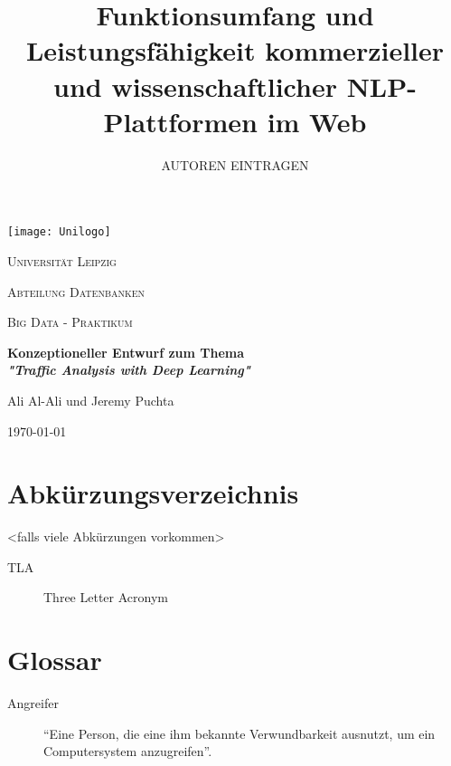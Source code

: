 \documentclass[12pt,a4paper, halfparskip]{scrartcl}
\title{Funktionsumfang und Leistungsfähigkeit kommerzieller und wissenschaftlicher NLP-Plattformen im Web}
\author{AUTOREN EINTRAGEN}
\begin{document}
\begin{titlepage}
	\centering
	\texttt{[image: Unilogo]}\par\vspace{1cm}
	{\scshape\LARGE Universität Leipzig \par}
	\vspace{0.5cm}
	{\scshape\Large Abteilung Datenbanken \par}
	\vspace{0.2cm}
	{\scshape\large Big Data - Praktikum \par}
	\vspace{1cm}
	{\huge\bfseries Konzeptioneller Entwurf zum Thema \\ \textit{"Traffic Analysis with Deep Learning"} \par}
	\vspace{1cm}
	{\Large Ali Al-Ali und Jeremy Puchta \par}

	\vfill
	
	{\large \today\par}
\end{titlepage}

\newpage

\thispagestyle{empty}
\tableofcontents
{}

\newpage
\pagestyle{empty}
\listoffigures
{}

\newpage
\listoftables
{}

\newpage
{}





\newpage
{}

\newpage
{}
\setcounter{page}{4}
\pagestyle{empty}

\renewcommand{\refname}{Literaturverzeichnis} 


\newpage
\pagestyle{empty}
\section*{Abkürzungsverzeichnis}
<falls viele Abkürzungen vorkommen>
\begin{description}
	\item [TLA] Three Letter Acronym
\end{description}

\newpage
\pagestyle{empty}
\section*{Glossar}
\begin{description}
	\item[Angreifer] "`Eine Person, die eine ihm bekannte Verwundbarkeit ausnutzt, um ein Computersystem anzugreifen"'. 
\end{description}

\end{document}
